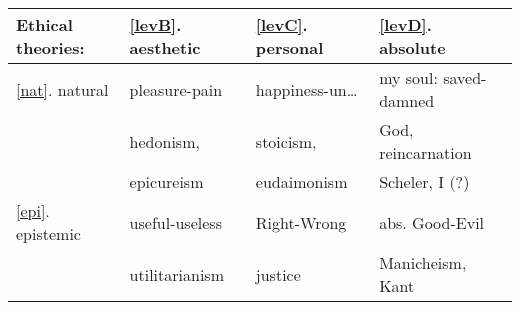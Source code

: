 \begin{tabular}{l||l|l|l}
Ethical theories: &  \ref{levB}. aesthetic & \ref{levC}. personal & 
             \ref{levD}. absolute  \\ \hline\hline
\ref{nat}. natural & pleasure-pain & happiness-un\ldots & my soul: 
saved-damned \\
         & hedonism, & stoicism, & God, reincarnation
\\
         & epicureism & eudaimonism & Scheler, I (?)
\\ \hline
\ref{epi}. epistemic & useful-useless   &  Right-Wrong & abs. Good-Evil 
\\                
          & utilitarianism    &  justice     & Manicheism, Kant 
\end{tabular}